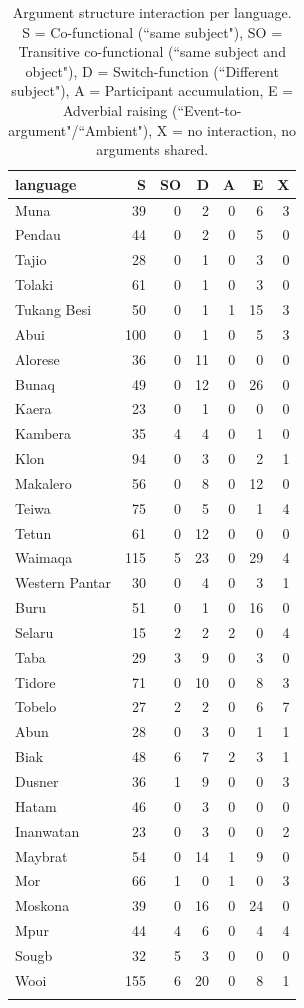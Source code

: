 \begin{table}
\begin{tabular}{lrrrrrr}
  \lsptoprule
language & S & SO & D & A & E & X \tabularnewline
  \hline
  Muna &  39 &   0 &   2 &   0 &   6 &   3 \tabularnewline 
  Pendau &  44 &   0 &   2 &   0 &   5 &   0 \tabularnewline 
  Tajio &  28 &   0 &   1 &   0 &   3 &   0 \tabularnewline 
  Tolaki &  61 &   0 &   1 &   0 &   3 &   0 \tabularnewline 
  Tukang Besi &  50 &   0 &   1 &   1 &  15 &   3 \tabularnewline 
  \hline
  Abui & 100 &   0 &   1 &   0 &   5 &   3 \tabularnewline 
  Alorese &  36 &   0 &  11 &   0 &   0 &   0 \tabularnewline 
  Bunaq &  49 &   0 &  12 &   0 &  26 &   0 \tabularnewline 
  Kaera &  23 &   0 &   1 &   0 &   0 &   0 \tabularnewline 
  Kambera &  35 &   4 &   4 &   0 &   1 &   0 \tabularnewline 
  Klon &  94 &   0 &   3 &   0 &   2 &   1 \tabularnewline 
  Makalero &  56 &   0 &  8 &   0 &  12 &   0 \tabularnewline 
  Teiwa &  75 &   0 &   5 &   0 &   1 &   4 \tabularnewline 
  Tetun &  61 &   0 &  12 &   0 &   0 &   0 \tabularnewline 
  Waimaqa & 115 &   5 &  23 &   0 &  29 &   4 \tabularnewline 
  Western Pantar &  30 &   0 &   4 &   0 &   3 &   1 \tabularnewline 
  \hline
  Buru & 51 & 0 & 1 & 0 & 16 & 0 \tabularnewline
  Selaru &  15 &   2 &   2 &   2 &   0 &   4 \tabularnewline 
  Taba &  29 &   3 &  9 &   0 &   3 &   0 \tabularnewline 
  Tidore & 71 & 0 & 10 & 0 & 8 & 3 \tabularnewline
  Tobelo &  27 &   2 &   2 &   0 &   6 &  7 \tabularnewline 
  \hline
  Abun &  28 &   0 &   3 &   0 &   1 &   1 \tabularnewline 
  Biak &  48 &   6 &  7 &   2 &   3 &   1 \tabularnewline 
  Dusner &  36 &   1 &  9 &   0 &   0 &   3 \tabularnewline 
  Hatam &  46 &   0 &  3 &   0 &   0 &   0 \tabularnewline 
  Inanwatan &  23 &   0 &   3 &   0 &   0 &   2 \tabularnewline 
  Maybrat &  54 &   0 &  14 &   1 &  9 &   0 \tabularnewline 
  Mor &  66 &   1 &   0 &   1 &   0 &  3 \tabularnewline 
  Moskona &  39 &   0 &  16 &   0 &  24 &   0 \tabularnewline 
  Mpur &  44 &   4 &   6 &   0 &   4 &   4 \tabularnewline 
  Sougb &  32 &   5 &   3 &   0 &   0 &   0 \tabularnewline 
  Wooi & 155 &   6 &  20 &   0 &   8 &   1 \tabularnewline 
   \lspbottomrule
\end{tabular}
\caption[Argument structure interaction per language]{Argument structure interaction per language. S = Co-functional (``same subject"), SO = Transitive co-functional (``same subject and object"), D = Switch-function (``Different subject"), A = Participant accumulation, E = Adverbial raising (``Event-to-argument"/``Ambient"), X = no interaction, no arguments shared.}
\label{table:Referentiality_per_lang}
\end{table}

